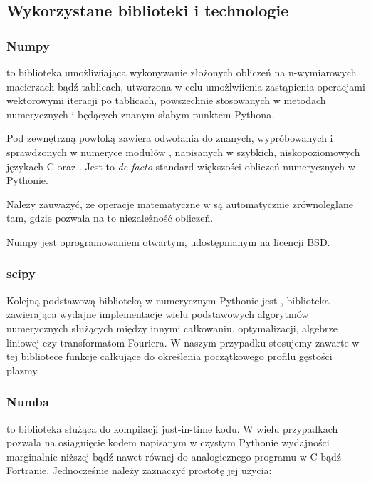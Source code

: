     \subsection{Wykorzystane biblioteki i technologie}

    \subsubsection{Numpy}
     to biblioteka umożliwiająca wykonywanie złożonych obliczeń na
    n-wymiarowych macierzach bądź tablicach, utworzona w celu umożlwiienia
    zastąpienia operacjami wektorowymi iteracji po tablicach, powszechnie
    stosowanych w metodach numerycznych i będących znanym słabym punktem
    Pythona.

    Pod zewnętrzną powłoką zawiera odwołania do znanych, wypróbowanych i
    sprawdzonych w numeryce modułów ,  napisanych w
    szybkich, niskopoziomowych językach C oraz .  Jest to
    \emph{de facto} standard większości obliczeń numerycznych w Pythonie.

    Należy zauważyć, że operacje matematyczne w  są automatycznie
    zrównoleglane  tam, gdzie pozwala na to
    niezależność obliczeń.

    Numpy jest oprogramowaniem otwartym, udostępnianym na licencji BSD.

    \subsubsection{scipy}
    Kolejną podstawową biblioteką w numerycznym Pythonie jest ,
    biblioteka zawierająca wydajne implementacje wielu podstawowych algorytmów
    numerycznych służących między innymi całkowaniu, optymalizacji, algebrze
    liniowej czy transformatom Fouriera.  W naszym przypadku stosujemy zawarte
    w tej bibliotece funkcje całkujące do określenia początkowego profilu
    gęstości plazmy.  

    \subsubsection{Numba}
     to biblioteka służąca do kompilacji just-in-time kodu.
     W wielu przypadkach
    pozwala na osiągnięcie kodem napisanym w czystym Pythonie wydajności
    marginalnie niższej bądź nawet równej do analogicznego programu w C bądź
    Fortranie.  Jednocześnie należy zaznaczyć prostotę jej
    użycia:

